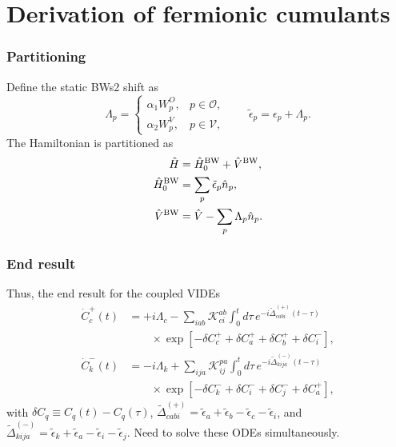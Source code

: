 \section{Derivation of fermionic cumulants}
\begin{frame}
    \frametitle{Partitioning}
Define the static BWs2 shift as
\begin{equation}
\Lambda_p
=
\begin{cases}
\alpha_1 W_p^{O}, & p\in\mathcal O,\\[1mm]
\alpha_2 W_p^{V}, & p\in\mathcal V,
\end{cases}
\qquad
\tilde{\epsilon}_p
=
\epsilon_p+\Lambda_p.
\end{equation}
The Hamiltonian is partitioned as
\begin{align}
\hat H
&=
\hat H_0^{\rm BW}
+
\hat V^{\rm BW},\\
\hat H_0^{\rm BW}
&=
\sum_p
\tilde{\epsilon}_p\hat n_p,\\
\hat V^{\rm BW}
&=
\hat V
-
\sum_p
\Lambda_p\hat n_p .
\end{align}
\end{frame}
\begin{frame}
    \frametitle{End result}
Thus, the end result for the coupled VIDEs
\begin{align}
\dot C_c^+(t)
&=
+i\Lambda_c
-
\sum_{iab}
\mathcal{K}_{ci}^{ab}
\int_0^t d\tau\,
e^{-i\widetilde{\Delta}_{cabi}^{(+)}(t-\tau)}
\nonumber\\
&\qquad\times
\exp\left[
-\delta C_c^+
+\delta C_a^+
+\delta C_b^+
+\delta C_i^-
\right],
\\[2mm]
\dot C_k^-(t)
&=
-i\Lambda_k
+
\sum_{ija}
\mathcal{K}_{ij}^{pa}
\int_0^t d\tau\,
e^{-i\widetilde{\Delta}_{kija}^{(-)}(t-\tau)}
\nonumber\\
&\qquad\times
\exp\left[
-\delta C_k^-
+\delta C_i^-
+\delta C_j^-
+\delta C_a^+
\right],
\end{align}
with $\delta C_q\equiv C_q(t)-C_q(\tau)$, $\widetilde{\Delta}_{cabi}^{(+)}=\tilde{\epsilon}_a+\tilde{\epsilon}_b-\tilde{\epsilon}_c-\tilde{\epsilon}_i$, and $\widetilde{\Delta}_{kija}^{(-)}=\tilde{\epsilon}_k+\tilde{\epsilon}_a-\tilde{\epsilon}_i-\tilde{\epsilon}_j$.
\pause Need to solve these ODEs simultaneously.
\end{frame}